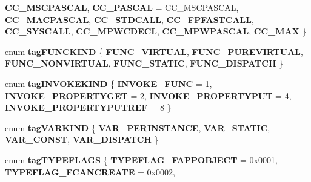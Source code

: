 \begin{DoxyCompactItemize}
{\bfseries C\+C\+\_\+\+M\+S\+C\+P\+A\+S\+C\+AL}, 
{\bfseries C\+C\+\_\+\+P\+A\+S\+C\+AL} = C\+C\+\_\+\+M\+S\+C\+P\+A\+S\+C\+AL, 
\newline
{\bfseries C\+C\+\_\+\+M\+A\+C\+P\+A\+S\+C\+AL}, 
{\bfseries C\+C\+\_\+\+S\+T\+D\+C\+A\+LL}, 
{\bfseries C\+C\+\_\+\+F\+P\+F\+A\+S\+T\+C\+A\+LL}, 
{\bfseries C\+C\+\_\+\+S\+Y\+S\+C\+A\+LL}, 
\newline
{\bfseries C\+C\+\_\+\+M\+P\+W\+C\+D\+E\+CL}, 
{\bfseries C\+C\+\_\+\+M\+P\+W\+P\+A\+S\+C\+AL}, 
{\bfseries C\+C\+\_\+\+M\+AX}
 \}
\item 
\mbox{\label{interface_i_ole_automation_types_a98a5aecfdd841d3194cc4b73f8f51701}} 
enum {\bfseries tag\+F\+U\+N\+C\+K\+I\+ND} \{ \newline
{\bfseries F\+U\+N\+C\+\_\+\+V\+I\+R\+T\+U\+AL}, 
{\bfseries F\+U\+N\+C\+\_\+\+P\+U\+R\+E\+V\+I\+R\+T\+U\+AL}, 
{\bfseries F\+U\+N\+C\+\_\+\+N\+O\+N\+V\+I\+R\+T\+U\+AL}, 
{\bfseries F\+U\+N\+C\+\_\+\+S\+T\+A\+T\+IC}, 
\newline
{\bfseries F\+U\+N\+C\+\_\+\+D\+I\+S\+P\+A\+T\+CH}
 \}
\item 
\mbox{\label{interface_i_ole_automation_types_a31b30068aa6791c6721ed352980f9d73}} 
enum {\bfseries tag\+I\+N\+V\+O\+K\+E\+K\+I\+ND} \{ {\bfseries I\+N\+V\+O\+K\+E\+\_\+\+F\+U\+NC} = 1, 
{\bfseries I\+N\+V\+O\+K\+E\+\_\+\+P\+R\+O\+P\+E\+R\+T\+Y\+G\+ET} = 2, 
{\bfseries I\+N\+V\+O\+K\+E\+\_\+\+P\+R\+O\+P\+E\+R\+T\+Y\+P\+UT} = 4, 
{\bfseries I\+N\+V\+O\+K\+E\+\_\+\+P\+R\+O\+P\+E\+R\+T\+Y\+P\+U\+T\+R\+EF} = 8
 \}
\item 
\mbox{\label{interface_i_ole_automation_types_a90b6de1b5912e9d0a7eb2decadfa38f6}} 
enum {\bfseries tag\+V\+A\+R\+K\+I\+ND} \{ {\bfseries V\+A\+R\+\_\+\+P\+E\+R\+I\+N\+S\+T\+A\+N\+CE}, 
{\bfseries V\+A\+R\+\_\+\+S\+T\+A\+T\+IC}, 
{\bfseries V\+A\+R\+\_\+\+C\+O\+N\+ST}, 
{\bfseries V\+A\+R\+\_\+\+D\+I\+S\+P\+A\+T\+CH}
 \}
\item 
\mbox{\label{interface_i_ole_automation_types_a03e52d15ad113154e61c31341571f3e8}} 
enum {\bfseries tag\+T\+Y\+P\+E\+F\+L\+A\+GS} \{ \newline
{\bfseries T\+Y\+P\+E\+F\+L\+A\+G\+\_\+\+F\+A\+P\+P\+O\+B\+J\+E\+CT} = 0x0001, 
{\bfseries T\+Y\+P\+E\+F\+L\+A\+G\+\_\+\+F\+C\+A\+N\+C\+R\+E\+A\+TE} = 0x0002, 

\end{DoxyCompactItemize}
